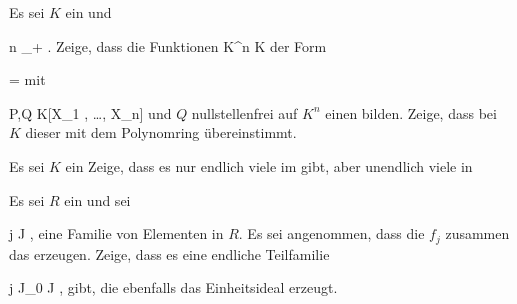 {}
{





Es sei $K$ ein
und

\mavergleichskette
{\vergleichskette
{ n
}
{ \in }{ \N_+
}
{  }{
}
{    }{
}
{   }{
}
}
{}{}{.}
Zeige, dass die Funktionen
\maabb {\varphi} { K^n } { K
} {}
der Form

\mavergleichskettedisp
{\vergleichskette
{ \varphi
}
{ =} { {  }
}
{ } {
}
{ } {
}
{ } {
}
}
{}{}{}
mit

\mavergleichskette
{\vergleichskette
{ P,Q
}
{ \in }{ K[X_1 , \ldots , X_n]
}
{  }{
}
{    }{
}
{   }{
}
}
{}{}{}
und $Q$ nullstellenfrei auf $K^n$ einen
bilden. Zeige, dass bei $K$
dieser mit dem Polynomring übereinstimmt.





}
{} {}

{}
{





Es sei $K$ ein
Zeige, dass es nur endlich viele
im
 gibt, aber unendlich viele
in





}
{} {}

{}
{





Es sei $R$ ein
und sei

 {}
 {j \in J} {}
 {} {} {} {,}
eine Familie von Elementen in $R$. Es sei angenommen, dass die $f_j$ zusammen das
erzeugen. Zeige, dass es eine endliche Teilfamilie

 {}
 {j \in J_0 \subseteq J} {}
 {} {} {} {,}
gibt, die ebenfalls das Einheitsideal erzeugt.





}
{} {}

